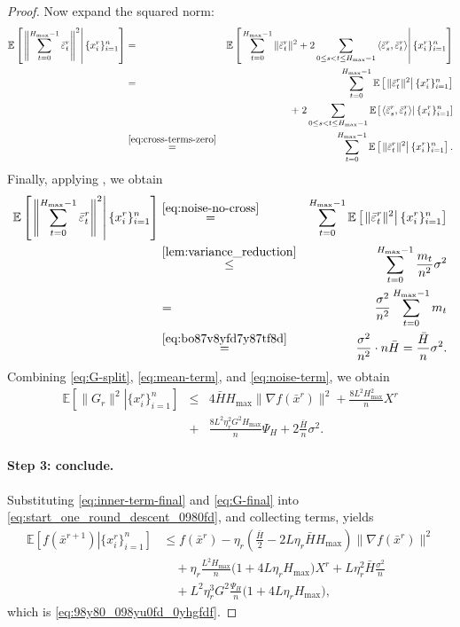 \documentclass{article}
\newcommand{\anglebr}[1]{\left\langle#1\right\rangle} %
\newcommand{\inner}[2]{\anglebr{#1, #2}}
\newcommand{\ExpCond}[2]{{\mathbb{E}}\left[\left.#1\right\vert#2\right]}
\theoremstyle{plain}
\theoremstyle{definition}
\begin{document}
\begin{proof}
Now expand the squared norm:
\begin{eqnarray}
\ExpCond{ \left\|\sum_{t=0}^{H_{\max}-1}\bar\varepsilon_t^r\right\|^2 }{ \{x_i^r\}_{i=1}^n }
&=&
\ExpCond{
\sum_{t=0}^{H_{\max}-1}\|\bar\varepsilon_t^r\|^2
+
2\sum_{0\le s<t\le H_{\max}-1}\inner{\bar\varepsilon_s^r}{\bar\varepsilon_t^r}
}{ \{x_i^r\}_{i=1}^n }
\notag\\
&=&
\sum_{t=0}^{H_{\max}-1}
\ExpCond{\|\bar\varepsilon_t^r\|^2}{ \{x_i^r\}_{i=1}^n } \notag\\
&&\; + \;
2\sum_{0\le s<t\le H_{\max}-1}
\ExpCond{\inner{\bar\varepsilon_s^r}{\bar\varepsilon_t^r}}{ \{x_i^r\}_{i=1}^n }
\notag\\
&\overset{\eqref{eq:cross-terms-zero}}{=}&
\sum_{t=0}^{H_{\max}-1}
\ExpCond{\|\bar\varepsilon_t^r\|^2}{ \{x_i^r\}_{i=1}^n }.
\label{eq:noise-no-cross}
\end{eqnarray}
Finally, applying , we obtain
\begin{eqnarray}
\ExpCond{ \left\|\sum_{t=0}^{H_{\max}-1}\bar\varepsilon_t^r\right\|^2 }{ \{x_i^r\}_{i=1}^n }
&\overset{\eqref{eq:noise-no-cross}}{=}&
\sum_{t=0}^{H_{\max}-1}
\ExpCond{\|\bar\varepsilon_t^r\|^2}{ \{x_i^r\}_{i=1}^n }
\notag\\
&\overset{\Cref{lem:variance_reduction}}{\leq}& \sum_{t=0}^{H_{\max}-1}
\frac{m_t}{n^2}\sigma^2
\notag\\
&=&
\frac{\sigma^2}{n^2}\sum_{t=0}^{H_{\max}-1} m_t
\notag\\
&\overset{\eqref{eq:bo87v8yfd7y87tf8d}}{=}&
\frac{\sigma^2}{n^2}\cdot n\bar H
=
\frac{\bar H}{n}\sigma^2.
\label{eq:noise-term}
\end{eqnarray}
% 
% 
Combining \eqref{eq:G-split}, \eqref{eq:mean-term}, and \eqref{eq:noise-term}, we obtain
\begin{eqnarray}
\ExpCond{ \|G_r\|^2 }{ \{x_i^r\}_{i=1}^n }
&\leq&
4\bar H H_{\max}\|\nabla f(\bar x^r)\|^2
+
\frac{8L^2H_{\max}^2}{n}X^r \\
&+& 
\frac{8L^2\eta_r^2G^2H_{\max}}{n}\Psi_H
+
2\frac{\bar H}{n}\sigma^2.
\label{eq:G-final}
\end{eqnarray}
% 
\paragraph{Step 3: conclude.}
Substituting \eqref{eq:inner-term-final} and \eqref{eq:G-final} into \eqref{eq:start_one_round_descent_0980fd}, and collecting terms, yields
\begin{align*}
\ExpCond{ f(\bar x^{r+1}) }{ \{x_i^r\}_{i=1}^n }
&\leq
f(\bar x^r)
-
\eta_r\left(\frac{\bar H}{2}-2L\eta_r \bar H H_{\max}\right)\|\nabla f(\bar x^r)\|^2
\\
&\quad
+
\eta_r\frac{L^2H_{\max}}{n}\bigl(1+4L\eta_r H_{\max}\bigr)X^{r}
+
L\eta_r^2\bar H\frac{\sigma^2}{n}
\\
&\quad
+
L^2\eta_r^3G^2\frac{\Psi_H}{n}\bigl(1+4L\eta_r H_{\max}\bigr),
\end{align*}
which is \eqref{eq:98y80_098yu0fd_0yhgfdf}.
\end{proof}
\end{document}
